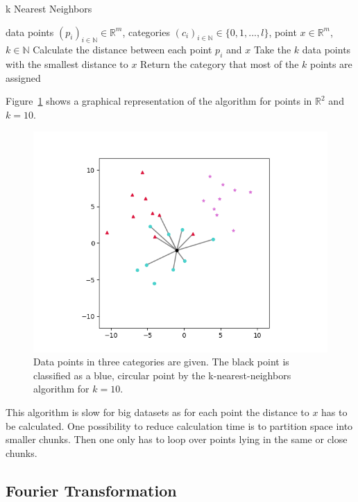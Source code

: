 \documentclass[a4paper]{IEEEtran}
\begin{document}
\begin{algorithm}
	\caption{k Nearest Neighbors}\label{alg:k_nearest_neighbors}
	\begin{algorithmic}
		\Require data points $(p_i)_{i \in \mathbb{N}} \in \mathbb{R}^{m}$, categories $(c_i)_{i \in \mathbb{N}} \in \{0, 1, ..., l\}$, point $x \in \mathbb{R}^{m}$, $k \in \mathbb{N}$
		\State Calculate the distance between each point $p_i$ and $x$
		\State Take the $k$ data points with the smallest distance to $x$
		\State Return the category that most of the $k$ points are assigned
	\end{algorithmic}
\end{algorithm}

Figure~\ref{fig:k_nearest_neighbors} shows a graphical representation of the algorithm for points in $\mathbb{R}^2$ and $k=10$.

\begin{figure}
	\centering
	\includegraphics[width=\linewidth]{figs/k_nearest_neighbors}
	\caption{Data points in three categories are given. The black point is classified as a blue, circular point by the k-nearest-neighbors algorithm for $k=10$.}
	\label{fig:k_nearest_neighbors}
\end{figure}

This algorithm is slow for big datasets as for each point the distance to $x$ has to be calculated. One possibility to reduce calculation time is to partition space into smaller chunks. Then one only has to loop over points lying in the same or close chunks.

\subsection{Fourier Transformation}
\label{subsec:fourier_transformation}
\end{document}
